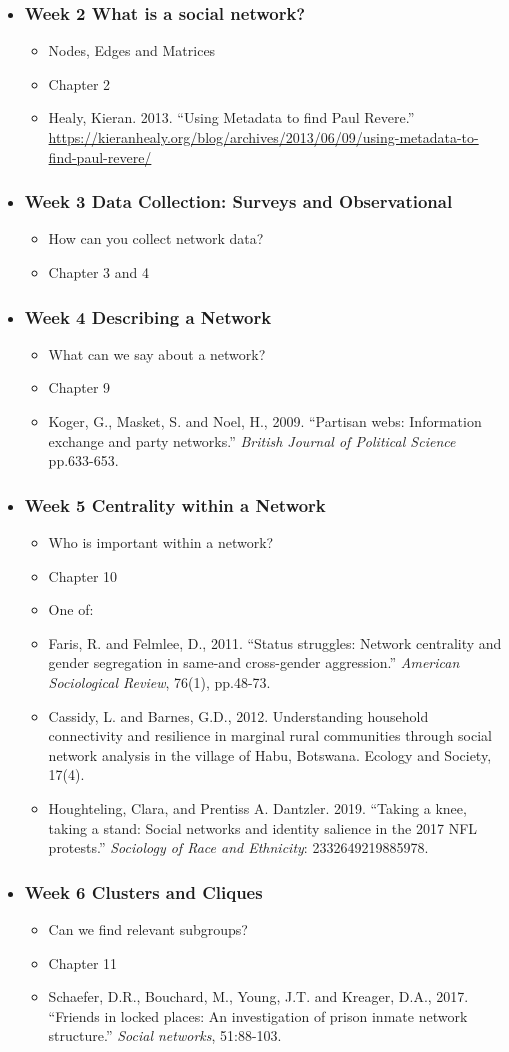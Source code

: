 \documentclass[11pt]{article}
\newenvironment{courseday}[2]{
\begin{itemize}
	\item[] \subsubsection*{\textbf{#1} #2}
	\begin{itemize}
}{
\end{itemize}
\end{itemize}
}
\begin{document}
\begin{courseday}{Week 2}{What is a social network?}
	\item[] Nodes, Edges and Matrices
	\item[] Chapter 2
	\item[] Healy, Kieran. 2013. ``Using Metadata to find Paul Revere.'' \url{https://kieranhealy.org/blog/archives/2013/06/09/using-metadata-to-find-paul-revere/} 
\end{courseday}


\begin{courseday}{Week 3}{Data Collection: Surveys and Observational}
	\item[] How can you collect network data? 
	\item[] Chapter 3 and 4
\end{courseday}


\begin{courseday}{Week 4}{Describing a Network}
	\item[]  What can we say about a network?
	\item[] Chapter 9
	\item[] Koger, G., Masket, S. and Noel, H., 2009. ``Partisan webs: Information exchange and party networks.'' \textit{British Journal of Political Science} pp.633-653.
\end{courseday}

\begin{courseday}{Week 5}{Centrality within a Network}
	\item[]  Who is important within a network?
	\item[] Chapter 10
	\item[] One of:
	\item Faris, R. and Felmlee, D., 2011. ``Status struggles: Network centrality and gender segregation in same-and cross-gender aggression.'' \textit{American Sociological Review}, 76(1), pp.48-73.
	\item Cassidy, L. and Barnes, G.D., 2012. Understanding household connectivity and resilience in marginal rural communities through social network analysis in the village of Habu, Botswana. Ecology and Society, 17(4).
	\item Houghteling, Clara, and Prentiss A. Dantzler. 2019. ``Taking a knee, taking a stand: Social networks and identity salience in the 2017 NFL protests.'' \textit{Sociology of Race and Ethnicity}: 2332649219885978.
\end{courseday}


\begin{courseday}{Week 6}{Clusters and Cliques}
	\item[] Can we find relevant subgroups?
	\item[] Chapter 11
	\item[] Schaefer, D.R., Bouchard, M., Young, J.T. and Kreager, D.A., 2017. ``Friends in locked places: An investigation of prison inmate network structure.'' \textit{Social networks}, 51:88-103.
	
	
\end{courseday}
\end{document}
